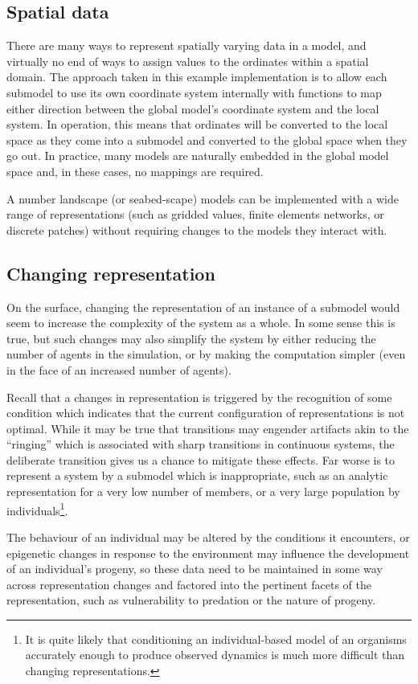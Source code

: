 \subsection{Spatial data}
There are many ways to represent spatially varying data in a model,
and virtually no end of ways to assign values to the ordinates within
a spatial domain. The approach taken in this example implementation is to allow
each submodel to use its own coordinate system internally with
functions to map either direction between the global model's
coordinate system and the local system.  In operation, this means that
ordinates will be converted to the local space as they come into a
submodel and converted to the global space when they go out. In
practice, many models are naturally embedded in the global model
space and, in these cases, no mappings are required.

A number landscape (or seabed-scape) models can be implemented 
with a wide range of representations (such as gridded values, finite
elements networks, or discrete patches) without requiring changes to
the models they interact with.

\subsection{Changing representation}
On the surface, changing the representation of an instance of a
submodel would seem to increase the complexity of the system as a
whole.  In some sense this is true, but such changes may also simplify
the system by either reducing the number of agents in the
simulation, or by making the computation simpler (even in the face of
an increased number of agents).

Recall that a changes in representation is triggered by the recognition
of some condition which indicates that the current configuration of
representations is not optimal. While it may be true that transitions
may engender artifacts akin to the ``ringing'' which is associated
with sharp transitions in continuous systems, the deliberate
transition gives us a chance to mitigate these effects.  Far worse is
to represent a system by a submodel which is inappropriate, such as
an analytic representation for a very low number of members, or a very
large population by individuals\footnote{It is quite likely that
conditioning an individual-based model of an organisms accurately
enough to produce observed dynamics is much more difficult than
changing representations.}.

The behaviour of an individual may be altered by the
conditions it encounters, or epigenetic changes in response to the
environment may influence the development of an individual's progeny,
so these data need to be maintained in some way across representation
changes and factored into the pertinent facets of the representation,
such as vulnerability to predation or the nature of progeny.

